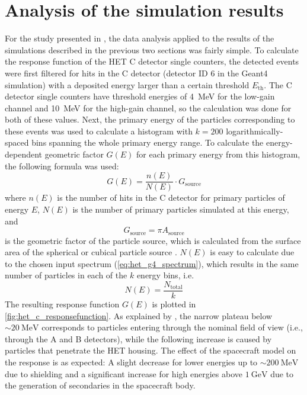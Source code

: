 \section{Analysis of the simulation results}
\label{sec:het_sim_analysis}

For the study presented in \citet{Forstner-2021-SolO}, the data analysis applied to the results of the simulations described in the previous two sections was fairly simple. To calculate the response function of the \ac{HET} C detector single counters, the detected events were first filtered for hits in the C detector (detector ID 6 in the \ac{Geant4} simulation) with a deposited energy larger than a certain threshold $E_\text{th}$. The C detector single counters have threshold energies of \SI{4}{\mega\electronvolt} for the low-gain channel and \SI{10}{\mega\electronvolt} for the high-gain channel, so the calculation was done for both of these values.
Next, the primary energy of the particles corresponding to these events was used to calculate a histogram with $k=200$ logarithmically-spaced bins spanning the whole primary energy range. To calculate the energy-dependent geometric factor $G(E)$ for each primary energy from this histogram, the following formula \citep[based on][equation 18]{Sullivan-1971} was used:
\begin{equation}
G(E) = \frac{n(E)}{N(E)} \cdot G_\text{source}
\end{equation}
where $n(E)$ is the number of hits in the C detector for primary particles of energy $E$, $N(E)$ is the number of primary particles simulated at this energy, and
\begin{equation}
G_\text{source} = \pi A_\text{source}
\end{equation}
is the geometric factor of the particle source, which is calculated from the surface area of the spherical or cubical particle source \citep[equation 6]{Sullivan-1971}. $N(E)$ is easy to calculate due to the chosen input spectrum (\autoref{eq:het_g4_spectrum}), which results in the same number of particles in each of the $k$ energy bins, i.e.
\begin{equation}
N(E) = \frac{N_\text{total}}{k}
\end{equation}
The resulting response function $G(E)$ is plotted in \autoref{fig:het_c_responsefunction}. As explained by \citet[Section 2.1]{Forstner-2021-SolO}, the narrow plateau below $\sim\SI{20}{\mega\electronvolt}$ corresponds to particles entering through the nominal field of view (i.e., through the A and B detectors), while the following increase is caused by particles that penetrate the \ac{HET} housing. The effect of the spacecraft model on the response is as expected: A slight decrease for lower energies up to $\sim\SI{200}{\mega\electronvolt}$ due to shielding and a significant increase for high energies above $\SI{1}{\giga\electronvolt}$ due to the generation of secondaries in the spacecraft body.

